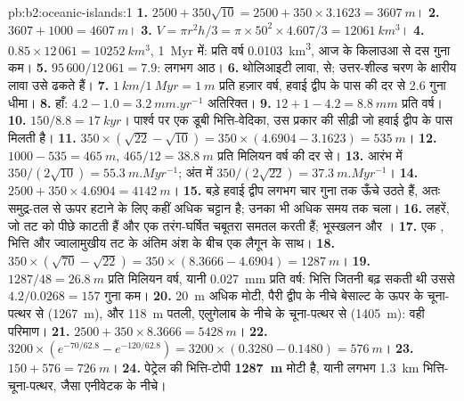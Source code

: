 \begin{solution}{pb:b2:oceanic-islands:1}
\textbf{1.} $2500 + 350\sqrt{10} = 2500 + 350\times3.1623 = \qty{3607}{m}$।
\textbf{2.} $3607 + 1000 = \qty{4607}{m}$।
\textbf{3.} $V = \pi r^2h/3 = \pi\times50^2\times4.607/3 = \qty{12061}{km^3}$।
\textbf{4.} $0.85\times12\,061 = \qty{10252}{km^3}$, \qty{1}{Myr} में: प्रति वर्ष \qty{0.0103}{km^3},
आज के किलाउआ से दस गुना कम।
\textbf{5.} $95\,600/12\,061 = 7.9$: लगभग आठ।
\textbf{6.} थोलिआइटी लावा,  से; उत्तर-शील्ड चरण के क्षारीय लावा उसे
ढकते हैं।
\textbf{7.} $\qty{1}{km}/\qty{1}{Myr} = \qty{1}{m}$ प्रति हज़ार वर्ष, हवाई द्वीप के पास की दर से 2.6 गुना
धीमा।
\textbf{8.} हाँ: $4.2 - 1.0 = \qty{3.2}{mm.yr^{-1}}$ अतिरिक्त।
\textbf{9.} $12 + 1 - 4.2 = \qty{8.8}{mm}$ प्रति वर्ष।
\textbf{10.} $150/8.8 = \qty{17}{kyr}$। पार्श्व पर एक डूबी भित्ति-वेदिका, उस प्रकार की सीढ़ी
जो हवाई द्वीप के पास मिलती है।
\textbf{11.} $350\times(\sqrt{22} - \sqrt{10}) = 350\times(4.6904 - 3.1623) = \qty{535}{m}$।
\textbf{12.} $1000 - 535 = \qty{465}{m}$, $465/12 = \qty{38.8}{m}$ प्रति मिलियन वर्ष की दर से।
\textbf{13.} आरंभ में $350/(2\sqrt{10}) = \qty{55.3}{m.Myr^{-1}}$; अंत में $350/(2\sqrt{22}) =
\qty{37.3}{m.Myr^{-1}}$।
\textbf{14.} $2500 + 350\times4.6904 = \qty{4142}{m}$।
\textbf{15.} बड़े हवाई द्वीप लगभग चार गुना तक ऊँचे उठते हैं, अतः समुद्र-तल से ऊपर हटाने के लिए कहीं अधिक
चट्टान है; उनका  भी अधिक समय तक चला।
\textbf{16.} लहरें, जो तट को पीछे काटती हैं और एक तरंग-घर्षित चबूतरा समतल करती हैं; भूस्खलन और ।
\textbf{17.} एक , भित्ति और ज्वालामुखीय तट के अंतिम अंश के बीच एक लैगून के साथ।
\textbf{18.} $350\times(\sqrt{70} - \sqrt{22}) = 350\times(8.3666 - 4.6904) = \qty{1287}{m}$।
\textbf{19.} $1287/48 = \qty{26.8}{m}$ प्रति मिलियन वर्ष, यानी
\qty{0.027}{mm} प्रति वर्ष: भित्ति जितनी बढ़ सकती थी उससे $4.2/0.0268 =
157$ गुना कम।
\textbf{20.} \qty{20}{m} अधिक मोटी, पैरी द्वीप के नीचे बेसाल्ट के ऊपर के चूना-पत्थर से (\qty{1267}{m}),
और \qty{118}{m} पतली, एलुगेलाब के नीचे के चूना-पत्थर से (\qty{1405}{m}): वही परिमाण।
\textbf{21.} $2500 + 350\times8.3666 = \qty{5428}{m}$।
\textbf{22.} $3200\times(e^{-70/62.8} - e^{-120/62.8}) = 3200\times(0.3280 - 0.1480) =
\qty{576}{m}$।
\textbf{23.} $150 + 576 = \qty{726}{m}$।
\textbf{24.} पेट्रेल  की भित्ति-टोपी \textbf{\qty{1287}{m}} मोटी है, यानी लगभग \qty{1.3}{km}
भित्ति-चूना-पत्थर, जैसा एनीवेटक के नीचे।
\end{solution}
